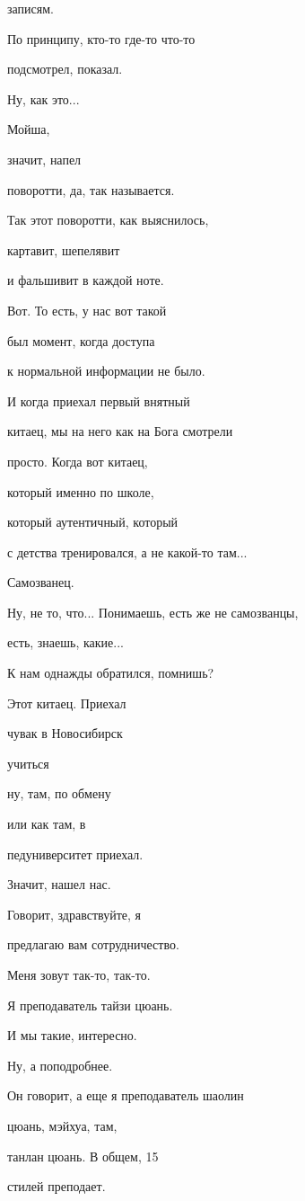 записям.

По принципу, кто-то где-то что-то

подсмотрел, показал.

Ну, как это...

Мойша,

значит, напел

поворотти, да, так называется.

Так этот поворотти, как выяснилось,

картавит, шепелявит

и фальшивит в каждой ноте.

Вот. То есть, у нас вот такой

был момент, когда доступа

к нормальной информации не было.

И когда приехал первый внятный

китаец, мы на него как на Бога смотрели

просто. Когда вот китаец,

который именно по школе,

который аутентичный, который

с детства тренировался, а не какой-то там...

Самозванец.

Ну, не то, что... Понимаешь, есть же не самозванцы,

есть, знаешь, какие...

К нам однажды обратился, помнишь?

Этот китаец. Приехал

чувак в Новосибирск

учиться

ну, там, по обмену

или как там, в

педуниверситет приехал.

Значит, нашел нас.

Говорит, здравствуйте, я

предлагаю вам сотрудничество.

Меня зовут так-то, так-то.

Я преподаватель тайзи цюань.

И мы такие, интересно.

Ну, а поподробнее.

Он говорит, а еще я преподаватель шаолин

цюань, мэйхуа, там,

танлан цюань. В общем, 15

стилей преподает.

